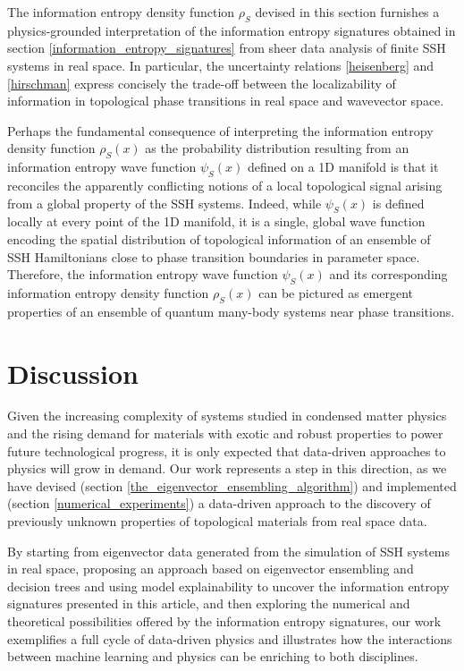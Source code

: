 \documentclass[10pt]{revtex4-1}
\begin{document}
The information entropy density function $\rho_S$ devised in this section furnishes a physics-grounded interpretation of the information entropy signatures obtained in section \ref{information_entropy_signatures} from sheer data analysis of finite SSH systems in real space. In particular, the uncertainty relations \eqref{heisenberg} and \eqref{hirschman} express concisely the trade-off between the localizability of information in topological phase transitions in real space and wavevector space. 

Perhaps the fundamental consequence of interpreting the information entropy density function $\rho_S(x)$ as the probability distribution resulting from an information entropy wave function $\psi_S(x)$ defined on a 1D manifold is that it reconciles the apparently conflicting notions of a local topological signal arising from a global property of the SSH systems. Indeed, while $\psi_S(x)$ is defined locally at every point of the 1D manifold, it is a single, global wave function encoding the spatial distribution of topological information of an ensemble of SSH Hamiltonians close to phase transition boundaries in parameter space. Therefore, the information entropy wave function $\psi_S(x)$ and its corresponding information entropy density function $\rho_S(x)$ can be pictured as emergent properties of an ensemble of quantum many-body systems near phase transitions.    

\section{Discussion}
\label{discussion}

Given the increasing complexity of systems studied in condensed matter physics and the rising demand for materials with exotic and robust properties to power future technological progress, it is only expected that data-driven approaches to physics will grow in demand. Our work represents a step in this direction, as we have devised (section \ref{the_eigenvector_ensembling_algorithm}) and implemented (section \ref{numerical_experiments}) a data-driven approach to the discovery of previously unknown properties of topological materials from real space data.

By starting from eigenvector data generated from the simulation of SSH systems in real space, proposing an approach based on eigenvector ensembling and decision trees and using model explainability to uncover the information entropy signatures presented in this article, and then exploring the numerical and theoretical possibilities offered by the information entropy signatures, our work exemplifies a full cycle of data-driven physics and illustrates how the interactions between machine learning and physics can be enriching to both disciplines.      
 
\end{document}
